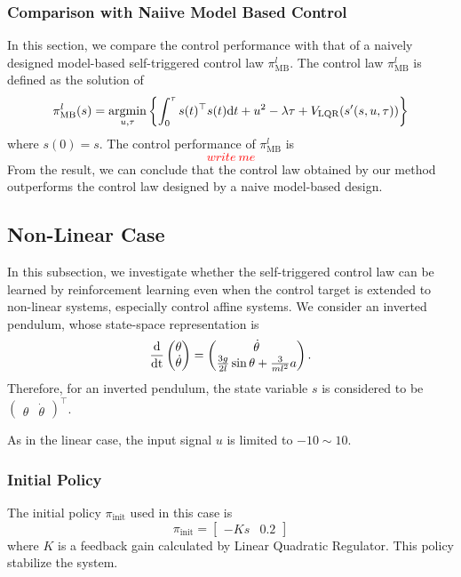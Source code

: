 \documentclass[english, dvipdfmx]{ampmt}             %
\newcommand{\unc}[1]{\textcolor{red}{#1}} %
\newcommand{\argmin}{\mathop{\rm argmin}\limits}
\newcommand{\odif}[2]{\frac{\rm{d}#1}{\rm{d}#2}}
\begin{document}
\subsubsection{Comparison with Naiive Model Based Control}
In this section, we compare the control performance with that of a naively designed model-based self-triggered control law $\pi^l_{\textrm{MB}}$. The control law $\pi^l_{\textrm{MB}}$ is defined as the solution of 
\begin{equation}
	\pi^l_{\textrm{MB}}(s) = \argmin_{u,\tau} \left\{\int_{0}^{\tau} s(t)^{\top}s(t)\textrm{d}t + u^2 - \lambda\tau + V_{\textrm{LQR}}(s^{\prime}(s,u,\tau))\right\}
\end{equation}
where $s(0) = s$. The control performance of $\pi^l_{\textrm{MB}}$ is 
\unc{
\begin{equation}
	write~me
\end{equation}
}
From the result, we can conclude that the control law obtained by our method outperforms the control law designed by a naive model-based design.


\subsection{Non-Linear Case}
In this subsection, we investigate whether the self-triggered control law can be learned by reinforcement learning even when the control target is extended to non-linear systems, especially control affine systems. We consider an inverted pendulum, whose state-space representation is
\begin{equation}
	\odif{}{t}\begin{pmatrix}\theta \\ \dot{\theta}\end{pmatrix} = 
		\begin{pmatrix}\dot{\theta} \\ \frac{3g}{2l}\sin{\theta} + \frac{3}{ml^2}a \end{pmatrix} \label{pendulum}.
\end{equation}
Therefore, for an inverted pendulum, the state variable $s$ is considered to be $\begin{pmatrix}\theta & \dot{\theta}\end{pmatrix}^{\top}$.
\par
As in the linear case, the input signal $u$ is limited to $-10 \sim 10$.

\subsubsection{Initial Policy}
The initial policy $\pi_{\textrm{init}}$ used in this case is
\begin{equation}
	\pi_{\textrm{init}} = \begin{bmatrix}-Ks&0.2\end{bmatrix}
\end{equation}
where $K$ is a feedback gain calculated by Linear Quadratic Regulator. This policy stabilize the system.
\end{document}
